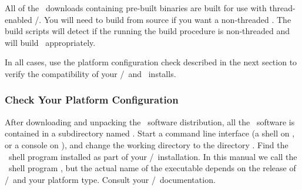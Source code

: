 All of the \OOMMF\ downloads containing pre-built binaries are built for
use with thread-enabled \Tcl/\Tk.  You will need to build from source if
you want a non-threaded \OOMMF.  The build scripts will detect if the
 running the build procedure is non-threaded and will build
\OOMMF\ appropriately.

In all cases, use the platform configuration check described in the next
section to verify the compatibility of your \Tcl/\Tk\ and \OOMMF\
installs.

\subsubsection{Check Your Platform Configuration}
\label{sec:platform.configuration}

After downloading and unpacking the \OOMMF\ software distribution, all
the \OOMMF\ software is contained in a subdirectory named \fn{oommf}.
Start a command line interface (a shell on \Unix, or a console
on \Windows), and change the 
working directory to the 
directory .  
Find the \Tcl\ shell program installed as part of your \Tcl/\Tk\ 
installation.  In this manual we call the \Tcl\ shell program
\fn{tclsh}, but the actual name of the executable depends
on the release of \Tcl/\Tk\ and your platform type.  Consult
your \Tcl/\Tk\ documentation.

